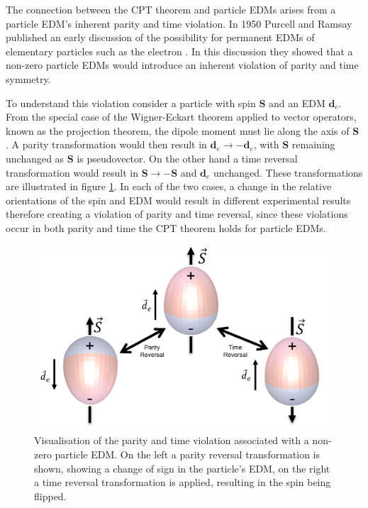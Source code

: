 The connection between the CPT theorem and particle EDMs arises from a particle EDM's inherent parity and time violation. In 1950 Purcell and Ramsay published an early discussion of the possibility for permanent EDMs of elementary particles such as the electron \cite{Purcell_Ramsay_1950}. In this discussion they showed that a non-zero particle EDMs would introduce an inherent violation of parity and time symmetry.

To understand this violation consider a particle with spin $\mathbf{S}$ and an EDM $\mathbf{d}_e$. From the special case of the Wigner-Eckart theorem applied to vector operators, known as the projection theorem, the dipole moment must lie along the axis of $\mathbf{S}$ \cite{Sakurai_1994}. A parity transformation would then result in $\mathbf{d}_e \rightarrow -\mathbf{d}_e$, with $\mathbf{S}$ remaining unchanged as $\mathbf{S}$ is pseudovector. On the other hand a time reversal transformation would result in  $\mathbf{S} \rightarrow -\mathbf{S}$ and $\mathbf{d}_e$ unchanged. These transformations are illustrated in figure \ref{fig:symmetry_violation}. In each of the two cases, a change in the relative orientations of the spin and EDM would result in different experimental results therefore creating a violation of parity and time reversal, since these violations occur in both parity and time the CPT theorem holds for particle EDMs.

\begin{figure}[!htp]
  \centering
  \includegraphics[scale=0.4]{images/symmetry_violation.png}
  \caption{Visualisation of the parity and time violation associated with a non-zero particle EDM. On the left a parity reversal transformation is shown, showing a change of sign in the particle's EDM, on the right a time reversal transformation is applied, resulting in the spin being flipped.}
  \label{fig:symmetry_violation}
\end{figure}

